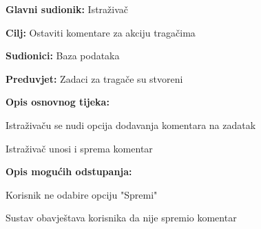 					\noindent {}
					\begin{packed_item}
						
						\item \textbf{Glavni sudionik:} Istraživač
						\item  \textbf{Cilj:} Ostaviti komentare za akciju tragačima 
						\item  \textbf{Sudionici:} Baza podataka
						\item  \textbf{Preduvjet:} Zadaci za tragače su stvoreni
						\item  \textbf{Opis osnovnog tijeka:}
						
						\item[] \begin{packed_enum}
							
							\item Istraživaču se nudi opcija dodavanja komentara na zadatak
							\item Istraživač unosi i sprema komentar
							
						\end{packed_enum}
						
						\item  \textbf{Opis mogućih odstupanja:}
						
						\item[] \begin{packed_item}
							
							\item[4.a]Korisnik ne odabire opciju "Spremi"
						\item[] \begin{packed_enum}
							
							\item Sustav obavještava korisnika da nije spremio komentar
							
						\end{packed_enum}
							
						\end{packed_item}
						
					\end{packed_item}
					
